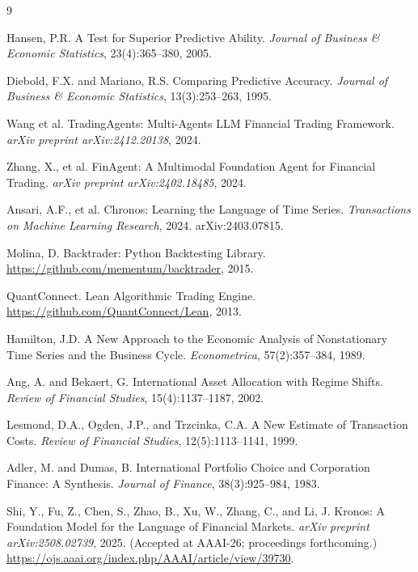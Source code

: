 \documentclass{article}
\begin{document}
\begin{thebibliography}{9}

Hansen, P.R.
\newblock A Test for Superior Predictive Ability.
\newblock \textit{Journal of Business \& Economic Statistics},
  23(4):365--380, 2005.

Diebold, F.X. and Mariano, R.S.
\newblock Comparing Predictive Accuracy.
\newblock \textit{Journal of Business \& Economic Statistics},
  13(3):253--263, 1995.

Wang et al.
\newblock TradingAgents: Multi-Agents LLM Financial Trading Framework.
\newblock \textit{arXiv preprint arXiv:2412.20138}, 2024.

Zhang, X., et al.
\newblock FinAgent: A Multimodal Foundation Agent for Financial Trading.
\newblock \textit{arXiv preprint arXiv:2402.18485}, 2024.

Ansari, A.F., et al.
\newblock Chronos: Learning the Language of Time Series.
\newblock \textit{Transactions on Machine Learning Research}, 2024.
  arXiv:2403.07815.

Molina, D.
\newblock Backtrader: Python Backtesting Library.
\newblock \url{https://github.com/mementum/backtrader}, 2015.

QuantConnect.
\newblock Lean Algorithmic Trading Engine.
\newblock \url{https://github.com/QuantConnect/Lean}, 2013.

Hamilton, J.D.
\newblock A New Approach to the Economic Analysis of Nonstationary Time Series
  and the Business Cycle.
\newblock \textit{Econometrica}, 57(2):357--384, 1989.

Ang, A. and Bekaert, G.
\newblock International Asset Allocation with Regime Shifts.
\newblock \textit{Review of Financial Studies}, 15(4):1137--1187, 2002.

Lesmond, D.A., Ogden, J.P., and Trzcinka, C.A.
\newblock A New Estimate of Transaction Costs.
\newblock \textit{Review of Financial Studies}, 12(5):1113--1141, 1999.

Adler, M. and Dumas, B.
\newblock International Portfolio Choice and Corporation Finance: A Synthesis.
\newblock \textit{Journal of Finance}, 38(3):925--984, 1983.

Shi, Y., Fu, Z., Chen, S., Zhao, B., Xu, W., Zhang, C., and Li, J.
\newblock Kronos: A Foundation Model for the Language of Financial Markets.
\newblock \textit{arXiv preprint arXiv:2508.02739}, 2025.
  (Accepted at AAAI-26; proceedings forthcoming.)
  \url{https://ojs.aaai.org/index.php/AAAI/article/view/39730}.


\end{thebibliography}
\end{document}
